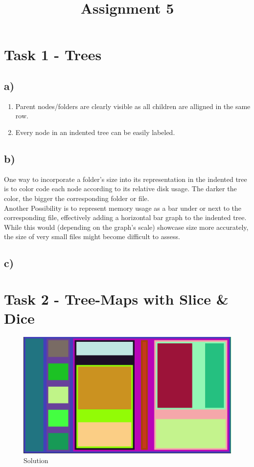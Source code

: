 \documentclass[a4paper]{article}
\date{}
\author{}
\title{\textbf{Assignment 5}}
\begin{document}
\maketitle 
\thispagestyle{fancy}

\section*{Task 1 - Trees}
\subsection*{a)}
\begin{enumerate}
	\item Parent nodes/folders are clearly visible as all children are alligned in the same row.
	\item Every node in an indented tree can be easily labeled.
\end{enumerate}
\subsection*{b)}
One way to incorporate a folder's size into its representation in the indented tree is to color code each node according to its relative disk usage. The darker the color, the bigger the corresponding folder or file.\\
Another Possibility is to represent memory usage as a bar under or next to the corresponding file, effectively adding a horizontal bar graph to the indented tree. While this would (depending on the graph's scale) showcase size more accurately, the size of very small files might become difficult to assess.
\subsection*{c)}



\section*{Task 2 - Tree-Maps with Slice \& Dice}
\begin{figure}[!ht]
	\centering
	\includegraphics[width=0.9\linewidth]{5_2}
	\caption{Solution}
\end{figure}
\end{document}
